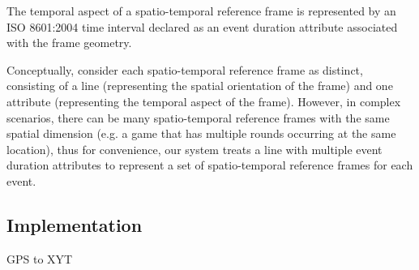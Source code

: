 The temporal aspect of a spatio-temporal reference frame is represented by an ISO 8601:2004 time interval declared as an event duration attribute associated with the frame geometry.




 Conceptually, consider each spatio-temporal reference frame as distinct, consisting of a line (representing the spatial orientation of the frame) and one attribute (representing the temporal aspect of the frame). However, in complex scenarios, there can be many spatio-temporal reference frames with the same spatial dimension (e.g. a game that has multiple rounds occurring at the same location), thus for convenience, our system treats a line with multiple event duration attributes to represent a set of spatio-temporal reference frames for each event.






\subsection{Implementation}

\begin{algorithm}
  \DontPrintSemicolon
  \caption{GPS to XYT}
  \label{alg:gps2xyt}
\end{algorithm}


